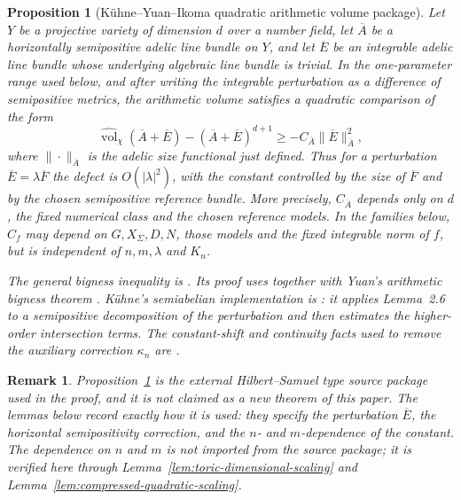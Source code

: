 \documentclass[10pt,a4paper]{amsart}
\theoremstyle{plain}
\newtheorem{proposition}[theorem]{Proposition}
\newtheorem{remark}[theorem]{Remark}
\theoremstyle{plain}
\numberwithin{equation}{section}
\providecommand{\widevol}{\widehat{\operatorname{vol}}_{\chi}}
\begin{document}
\begin{proposition}[K\"uhne--Yuan--Ikoma quadratic arithmetic volume package]
	\label{input:quadratic-volume}
	Let \(Y\) be a projective variety of dimension \(d\) over a number field, let
	\(\overline A\) be a horizontally semipositive adelic line bundle on \(Y\), and
	let \(\overline E\) be an integrable adelic line bundle whose underlying
	algebraic line bundle is trivial.  In the one-parameter range used below, and
	after writing the integrable perturbation as a difference of semipositive
	metrics, the arithmetic volume satisfies a quadratic comparison of the form
	\[
	\widevol(\overline A+\overline E)
	-(\overline A+\overline E)^{d+1}
	\ge
	-C_{\overline A}\|\overline E\|_{\overline A}^2,
	\]
	where \(\|\cdot\|_{\overline A}\) is the adelic size functional just defined.
	Thus for a perturbation \(\overline E=\lambda\overline F\) the
	defect is \(O(|\lambda|^2)\), with the constant controlled by the size of
	\(\overline F\) and by the chosen semipositive reference bundle.  More
	precisely, \(C_{\overline A}\) depends only on \(d\), the fixed numerical
	class and the chosen reference models.  In the families below, \(C_f\) may
	depend on \(G,X_\Sigma,D,N\), those models and the fixed integrable norm of
	\(f\), but is independent of \(n,m,\lambda\) and \(K_n\).
	
	The general bigness inequality is \cite[Lemma~2.6]{Ku1}.  Its proof uses
	\cite[Theorem 3.5.3 and Remark 3.5.4]{Iko13} together with Yuan's arithmetic
	bigness theorem \cite{Yua1}.  K\"uhne's semiabelian implementation is
	\cite[Lemma~4.6]{Ku1}: it applies Lemma~2.6 to a semipositive decomposition of
	the perturbation and then estimates the higher-order intersection terms.  The
	constant-shift and continuity facts used to remove the auxiliary correction
	\(\kappa_n\) are \cite[Lemma~2.5(a),(b)]{Ku1}.
\end{proposition}

\begin{remark}
	Proposition~\ref{input:quadratic-volume} is the external
	Hilbert--Samuel type source package used in the proof, and it is not claimed
	as a new theorem of this paper.  The lemmas below record exactly how it is used: they specify
	the perturbation \(\overline E\), the horizontal semipositivity correction, and
	the \(n\)- and \(m\)-dependence of the constant.  The dependence on \(n\) and
	\(m\) is not imported from the source package; it is verified here through
	Lemma~\ref{lem:toric-dimensional-scaling} and
	Lemma~\ref{lem:compressed-quadratic-scaling}.
\end{remark}
\end{document}
